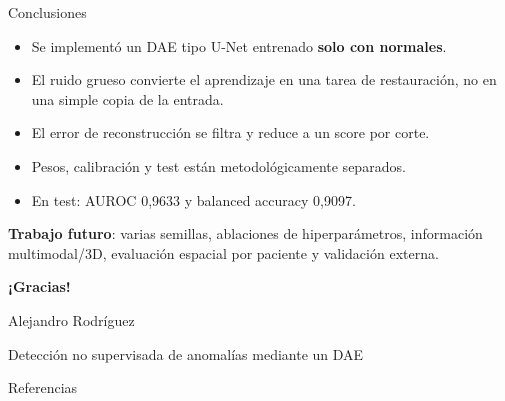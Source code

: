 \documentclass[10pt,aspectratio=169]{beamer}
\begin{document}
\begin{frame}{Conclusiones}
  \begin{itemize}
    \item Se implementó un DAE tipo U-Net entrenado \textbf{solo con normales}.
    \item El ruido grueso convierte el aprendizaje en una tarea de restauración,
          no en una simple copia de la entrada.
    \item El error de reconstrucción se filtra y reduce a un score por corte.
    \item Pesos, calibración y test están metodológicamente separados.
    \item En test: AUROC 0,9633 y balanced accuracy 0,9097.
  \end{itemize}

  \vspace{0.25cm}
  \textbf{Trabajo futuro}: varias semillas, ablaciones de hiperparámetros,
  información multimodal/3D, evaluación espacial por paciente y validación externa.
\end{frame}

\begin{frame}[plain]
  \centering
  \vspace{1.5cm}
  {\Huge\bfseries ¡Gracias!}
  \vspace{0.6cm}

  {\large Alejandro Rodríguez}
  \vspace{0.3cm}

  Detección no supervisada de anomalías mediante un DAE
\end{frame}

\begin{frame}[allowframebreaks]{Referencias}
  \scriptsize
  
  
\end{frame}
\end{document}
